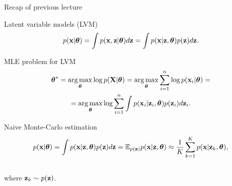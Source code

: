 

\begin{frame}
\titlepage
\end{frame}
\begin{frame}{Recap of previous lecture}
	\begin{block}{Latent variable models (LVM)}
		\vspace{-0.3cm}
		\[
			p(\mathbf{x} | \boldsymbol{\theta}) = \int p(\mathbf{x}, \mathbf{z} | \boldsymbol{\theta}) d\mathbf{z} = \int p(\mathbf{x} | \mathbf{z}, \boldsymbol{\theta}) p(\mathbf{z}) d\mathbf{z}.
		\]
	\end{block}
	\begin{block}{MLE problem for LVM}
		\vspace{-0.7cm}
		\begin{multline*}
			\boldsymbol{\theta}^* = \operatorname*{arg\,max}_{\boldsymbol{\theta}} \log p(\mathbf{X}| \boldsymbol{\theta}) = \operatorname*{arg\,max}_{\boldsymbol{\theta}} \sum_{i=1}^n \log p(\mathbf{x}_i | \boldsymbol{\theta}) = \\ = \operatorname*{arg\,max}_{\boldsymbol{\theta}} \log \sum_{i=1}^n \int p(\mathbf{x}_i| \mathbf{z}_i, \boldsymbol{\theta}) p(\mathbf{z}_i) d\mathbf{z}_i.
		\end{multline*}
		\vspace{-0.7cm}
	\end{block}
	\begin{block}{Naive Monte-Carlo estimation}
		\vspace{-0.7cm}
		\[
			p(\mathbf{x} | \boldsymbol{\theta}) = \int p(\mathbf{x} | \mathbf{z}, \boldsymbol{\theta}) p(\mathbf{z}) d\mathbf{z} = \mathbb{E}_{p(\mathbf{z})} p(\mathbf{x} | \mathbf{z}, \boldsymbol{\theta}) \approx \frac{1}{K} \sum_{k=1}^{K} p(\mathbf{x} | \mathbf{z}_k, \boldsymbol{\theta}),
		\]
		\vspace{-0.5cm} \\
		where $\mathbf{z}_k \sim p(\mathbf{z})$. 
	\end{block}
\end{frame}
